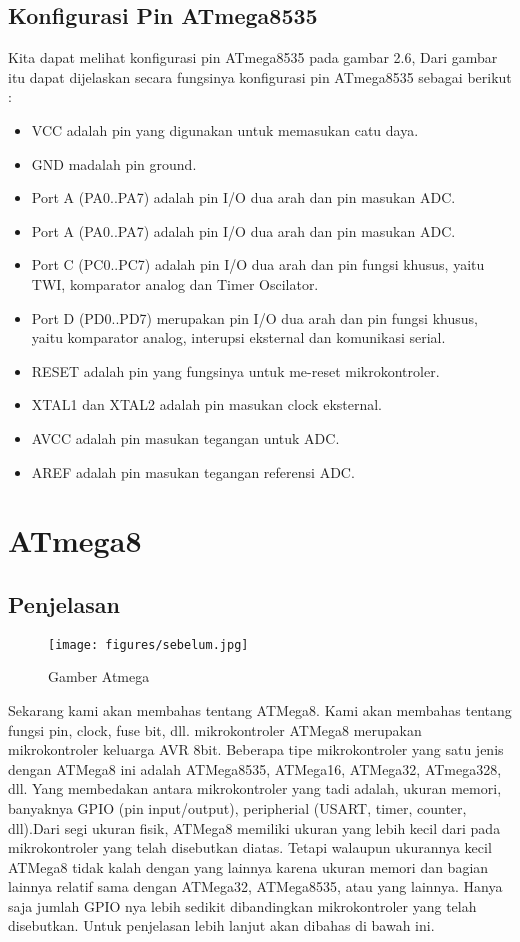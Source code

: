 		\subsection{Konfigurasi Pin ATmega8535}
		 Kita dapat melihat konfigurasi pin ATmega8535 pada gambar 2.6, Dari gambar itu dapat dijelaskan secara fungsinya konfigurasi pin ATmega8535 sebagai berikut :
		\begin{itemize}
			\item VCC adalah pin yang digunakan untuk memasukan catu daya.
			\item GND madalah pin ground.
			\item Port A (PA0..PA7) adalah pin I/O dua arah dan pin masukan ADC.
			\item Port A (PA0..PA7) adalah pin I/O dua arah dan pin masukan ADC.
			\item Port C (PC0..PC7) adalah pin I/O dua arah dan pin fungsi khusus, yaitu TWI, komparator analog dan Timer Oscilator.
			\item Port D (PD0..PD7) merupakan pin I/O dua arah dan pin fungsi khusus, yaitu komparator analog, interupsi eksternal dan komunikasi serial.
			\item RESET adalah pin yang fungsinya untuk me-reset mikrokontroler.
			\item XTAL1 dan XTAL2 adalah pin masukan clock eksternal.
			\item AVCC adalah pin masukan tegangan untuk ADC.
			\item AREF adalah pin masukan tegangan referensi ADC.
		\end{itemize}

\section{ATmega8}

	\subsection{Penjelasan}
		
		\begin{figure}[ht]
			\centerline{\texttt{[image: figures/sebelum.jpg]}}
			\caption{Gamber Atmega}
			\label{atmega8}
			\end{figure}
			
		Sekarang kami akan membahas tentang ATMega8. Kami akan membahas tentang fungsi pin, clock, fuse bit, dll. mikrokontroler ATMega8 merupakan mikrokontroler keluarga AVR 8bit. Beberapa tipe mikrokontroler yang satu jenis dengan ATMega8 ini adalah ATMega8535, ATMega16, ATMega32, ATmega328, dll. Yang membedakan antara mikrokontroler yang tadi adalah, ukuran memori, banyaknya GPIO (pin input/output), peripherial (USART, timer, counter, dll).Dari segi ukuran fisik, ATMega8 memiliki ukuran yang lebih kecil dari pada mikrokontroler yang telah disebutkan diatas. Tetapi walaupun ukurannya kecil ATMega8 tidak kalah dengan yang lainnya karena ukuran memori dan bagian lainnya relatif sama dengan ATMega32, ATMega8535, atau yang lainnya. Hanya saja jumlah GPIO nya lebih sedikit dibandingkan mikrokontroler yang telah disebutkan. Untuk penjelasan lebih lanjut akan dibahas di bawah ini.
	
